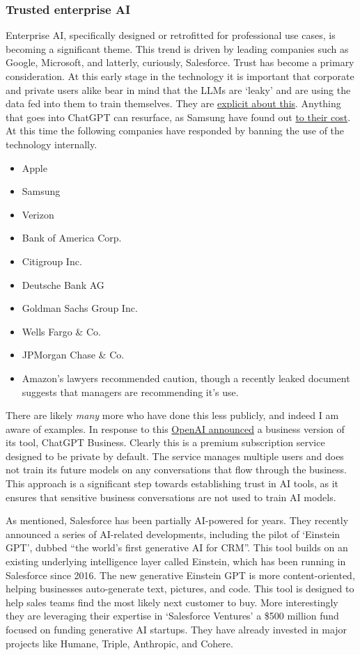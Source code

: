 \subsubsection{Trusted enterprise AI}
Enterprise AI, specifically designed or retrofitted for professional use cases, is becoming a significant theme. This trend is driven by leading companies such as Google, Microsoft, and latterly, curiously, Salesforce. Trust has become a primary consideration. At this early stage in the technology it is important that corporate and private users alike bear in mind that the LLMs are `leaky' and are using the data fed into them to train themselves. They are \href{https://help.openai.com/en/articles/6783457-chatgpt-general-faq}{explicit about this}. Anything that goes into ChatGPT can resurface, as Samsung have found out \href{https://cybernews.com/news/chatgpt-samsung-data-leak/}{to their cost}. At this time the following companies have responded by banning the use of the technology internally. 
\begin{itemize}
\item Apple
\item Samsung
\item Verizon
\item Bank of America Corp.
\item Citigroup Inc.
\item Deutsche Bank AG
\item Goldman Sachs Group Inc.
\item Wells Fargo \& Co.
\item JPMorgan Chase \& Co.
\item Amazon's lawyers recommended caution, though a recently leaked document suggests that managers are recommending it's use.
\end{itemize}
There are likely \textit{many} more who have done this less publicly, and indeed I am aware of examples. In response to this \href{https://openai.com/blog/new-ways-to-manage-your-data-in-chatgpt}{OpenAI announced} a business version of its tool, ChatGPT Business. Clearly this is a premium subscription service designed to be private by default. The service manages multiple users and does not train its future models on any conversations that flow through the business. This approach is a significant step towards establishing trust in AI tools, as it ensures that sensitive business conversations are not used to train AI models.\par
As mentioned, Salesforce has been partially AI-powered for years. They recently announced a series of AI-related developments, including the pilot of `Einstein GPT', dubbed ``the world's first generative AI for CRM''. This tool builds on an existing underlying intelligence layer called Einstein, which has been running in Salesforce since 2016. The new generative Einstein GPT is more content-oriented, helping businesses auto-generate text, pictures, and code. This tool is designed to help sales teams find the most likely next customer to buy. More interestingly they are leveraging their expertise in `Salesforce Ventures' a \$500 million fund focused on funding generative AI startups. They have already invested in major projects like Humane, Triple, Anthropic, and Cohere.\par
